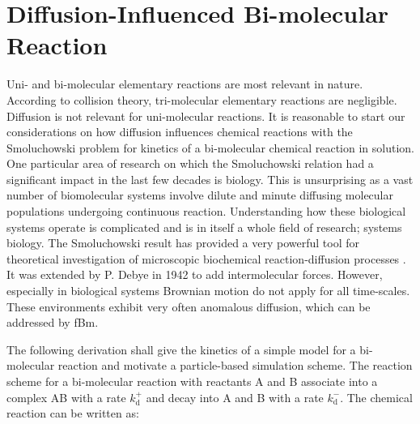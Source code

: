 \documentclass[
  a4paper,BCOR10mm,twoside,
  headsepline,footsepline,%
  fleqn,openbib
]{scrbook}
\begin{document}
% 
% 
% 
% 

\section{Diffusion-Influenced Bi-molecular Reaction}\label{Erban-chapman-section}
Uni- and bi-molecular elementary reactions are most relevant in nature. According to collision theory, tri-molecular elementary reactions are negligible. Diffusion is not relevant for uni-molecular reactions. It is reasonable to start our considerations on how diffusion influences chemical reactions with the Smoluchowski problem for kinetics of a bi-molecular chemical reaction in solution. One particular area of research on which the Smoluchowski relation had a significant impact in the last few decades is biology. This is unsurprising as a vast number of biomolecular systems involve dilute and minute diffusing molecular populations undergoing continuous reaction. Understanding how these biological systems operate is complicated and is in itself a whole field of research; systems biology. The Smoluchowski result has provided a very powerful tool for theoretical investigation of microscopic biochemical reaction-diffusion processes \cite{Flegg}. It was extended by P. Debye in 1942 to add intermolecular forces. However, especially in biological systems Brownian motion do not apply for all time-scales. These environments exhibit very often anomalous diffusion, which can be addressed by fBm. 
\par
The following derivation shall give the kinetics of a simple model for a bi-molecular reaction and motivate a particle-based simulation scheme.
The reaction scheme for a bi-molecular reaction with reactants A and B associate into a complex AB with a rate $k^{+}_{\mathrm{d}}$ and decay into A and B with a rate $k^{-}_{\mathrm{d}}$. The chemical reaction can be written as:
\end{document}
